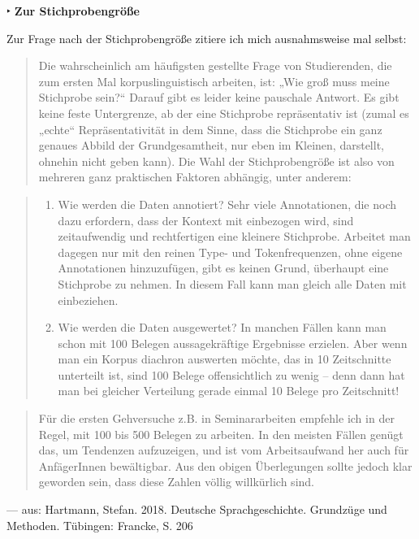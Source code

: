 \documentclass[]{article}
\providecommand{\tightlist}{%
  \setlength{\itemsep}{0pt}\setlength{\parskip}{0pt}}
\begin{document}
 ‣ \textbf{Zur Stichprobengröße}

Zur Frage nach der Stichprobengröße zitiere ich mich ausnahmsweise mal
selbst:

\begin{quote}
Die wahrscheinlich am häufigsten gestellte Frage von Studierenden, die
zum ersten Mal korpuslinguistisch arbeiten, ist: „Wie groß muss meine
Stichprobe sein?`` Darauf gibt es leider keine pauschale Antwort. Es
gibt keine feste Untergrenze, ab der eine Stichprobe repräsentativ ist
(zumal es „echte`` Repräsentativität in dem Sinne, dass die Stichprobe
ein ganz genaues Abbild der Grundgesamtheit, nur eben im Kleinen,
darstellt, ohnehin nicht geben kann). Die Wahl der Stichprobengröße ist
also von mehreren ganz praktischen Faktoren abhängig, unter anderem:
\end{quote}

\begin{quote}
\begin{enumerate}
\def\labelenumi{\alph{enumi})}
\tightlist
\item
  Wie werden die Daten annotiert? Sehr viele Annotationen, die noch dazu
  erfordern, dass der Kontext mit einbezogen wird, sind zeitaufwendig
  und rechtfertigen eine kleinere Stichprobe. Arbeitet man dagegen nur
  mit den reinen Type- und Tokenfrequenzen, ohne eigene Annotationen
  hinzuzufügen, gibt es keinen Grund, überhaupt eine Stichprobe zu
  nehmen. In diesem Fall kann man gleich alle Daten mit einbeziehen.
\item
  Wie werden die Daten ausgewertet? In manchen Fällen kann man schon mit
  100 Belegen aussagekräftige Ergebnisse erzielen. Aber wenn man ein
  Korpus diachron auswerten möchte, das in 10 Zeitschnitte unterteilt
  ist, sind 100 Belege offensichtlich zu wenig -- denn dann hat man bei
  gleicher Verteilung gerade einmal 10 Belege pro Zeitschnitt!
\end{enumerate}
\end{quote}

\begin{quote}
Für die ersten Gehversuche z.B. in Seminararbeiten empfehle ich in der
Regel, mit 100 bis 500 Belegen zu arbeiten. In den meisten Fällen genügt
das, um Tendenzen aufzuzeigen, und ist vom Arbeitsaufwand her auch für
AnfägerInnen bewältigbar. Aus den obigen Überlegungen sollte jedoch klar
geworden sein, dass diese Zahlen völlig willkürlich sind.
\end{quote}

\hfill --- aus: Hartmann, Stefan. 2018. Deutsche Sprachgeschichte.
Grundzüge und Methoden. Tübingen: Francke, S. 206
\end{document}
